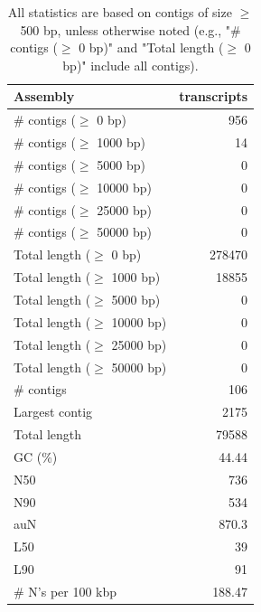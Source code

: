 \documentclass[12pt,a4paper]{article}
\begin{document}
\begin{table}[ht]
\begin{center}
\caption{All statistics are based on contigs of size $\geq$ 500 bp, unless otherwise noted (e.g., "\# contigs ($\geq$ 0 bp)" and "Total length ($\geq$ 0 bp)" include all contigs).}
\begin{tabular}{|l*{1}{|r}|}
\hline
Assembly & transcripts \\ \hline
\# contigs ($\geq$ 0 bp) & 956 \\ \hline
\# contigs ($\geq$ 1000 bp) & 14 \\ \hline
\# contigs ($\geq$ 5000 bp) & 0 \\ \hline
\# contigs ($\geq$ 10000 bp) & 0 \\ \hline
\# contigs ($\geq$ 25000 bp) & 0 \\ \hline
\# contigs ($\geq$ 50000 bp) & 0 \\ \hline
Total length ($\geq$ 0 bp) & 278470 \\ \hline
Total length ($\geq$ 1000 bp) & 18855 \\ \hline
Total length ($\geq$ 5000 bp) & 0 \\ \hline
Total length ($\geq$ 10000 bp) & 0 \\ \hline
Total length ($\geq$ 25000 bp) & 0 \\ \hline
Total length ($\geq$ 50000 bp) & 0 \\ \hline
\# contigs & 106 \\ \hline
Largest contig & 2175 \\ \hline
Total length & 79588 \\ \hline
GC (\%) & 44.44 \\ \hline
N50 & 736 \\ \hline
N90 & 534 \\ \hline
auN & 870.3 \\ \hline
L50 & 39 \\ \hline
L90 & 91 \\ \hline
\# N's per 100 kbp & 188.47 \\ \hline
\end{tabular}
\end{center}
\end{table}
\end{document}
